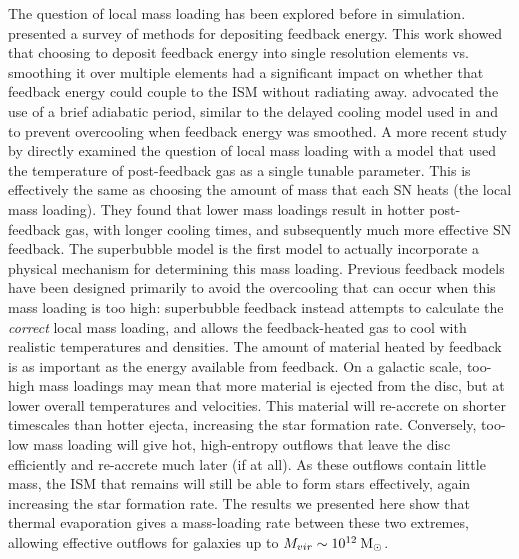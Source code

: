 The question of local mass loading has been explored before in simulation.
\citet{Thacker2000} presented a survey of methods for depositing feedback
energy.  This work showed that choosing to deposit feedback energy into single
resolution elements vs. smoothing it over multiple elements had a significant
impact on whether that feedback energy could couple to the ISM without radiating
away.  \citet{Thacker2000} advocated the use of a brief adiabatic period,
similar to the delayed cooling model used in \citet{Stinson2006} and
\citet{Rosdahl2016} to prevent overcooling when feedback energy was smoothed.  A
more recent study by \citet{DallaVecchia2012} directly examined the question of
local mass loading with a model that used the temperature of post-feedback
gas as a single tunable parameter.  This is effectively the same as choosing
the amount of mass that each SN heats (the local mass loading).
They found that lower mass loadings result in hotter post-feedback gas, with
longer cooling times, and subsequently much more effective SN feedback.
The \citet{Keller2014} superbubble model is the first model to actually
incorporate a physical mechanism for determining this mass loading.  Previous
feedback models have been designed primarily to avoid the overcooling that can
occur when this mass loading is too high: superbubble feedback instead attempts
to calculate the {\it correct} local mass loading, and allows the
feedback-heated gas to cool with realistic temperatures and densities.  The
amount of material heated by feedback is as important as the energy
available from feedback.  On a galactic scale, too-high mass loadings may mean that
more material is ejected from the disc, but at lower overall temperatures and
velocities.  This material will re-accrete on shorter timescales than hotter
ejecta, increasing the star formation rate.  Conversely, too-low mass loading
will give hot, high-entropy outflows that leave the disc efficiently and
re-accrete much later (if at all).  As these outflows contain little
mass, the ISM that remains will still be able to form stars effectively, again
increasing the star formation rate.  The results we presented here show that
thermal evaporation gives a mass-loading rate between these two extremes,
allowing effective outflows for galaxies up to $M_{vir}\sim10^{12}\>{\rm M_{\odot}}$.

